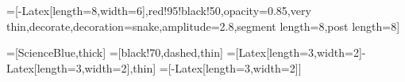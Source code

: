 






\usetikzlibrary{patterns,decorations.pathreplacing,angles,quotes}

=[-{Latex[length=8,width=6]},red!95!black!50,opacity=0.85,very thin,decorate,decoration={snake,amplitude=2.8,segment length=8,post length=8}]



\usetikzlibrary{calc}
\usetikzlibrary{arrows,arrows.meta,math}
\usetikzlibrary{decorations.markings}
\usetikzlibrary{angles,quotes} %
\usetikzlibrary{fadings}
\tikzset{>=latex} %
\contourlength{1.4pt}

=[ScienceBlue,thick]
=[black!70,dashed,thin]
=[{Latex[length=3,width=2]}-{Latex[length=3,width=2]},thin]
=[-{Latex[length=3,width=2]}]

\usetikzlibrary{decorations.pathmorphing}